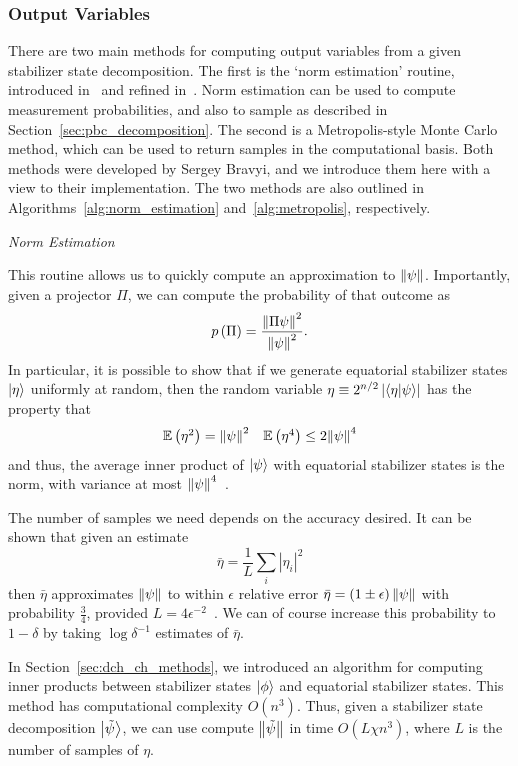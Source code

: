 \subsubsection*{Output Variables}
There are two main methods for computing output variables from a given stabilizer state decomposition. The first is the `norm estimation' routine, introduced in~\cite{Bravyi2016} and refined in~\cite{Bravyi2018}. Norm estimation can be used to compute measurement probabilities, and also to sample as described in Section~\ref{sec:pbc_decomposition}. The second is a Metropolis-style Monte Carlo method, which can be used to return samples in the computational basis. Both methods were developed by Sergey Bravyi, and we introduce them here with a view to their implementation. The two methods are also outlined in Algorithms~\ref{alg:norm_estimation} and~\ref{alg:metropolis}, respectively.\par
\large{\itshape{Norm Estimation}}\par
This routine allows us to quickly compute an approximation to $\norm{\psi}$. Importantly, given a projector $\Pi$, we can compute the probability of that outcome as
\begin{equation}
p\left(\Pi\right) = \frac{\norm{\Pi \psi}^{2}}{\norm{\psi}^{2}}.
\end{equation}
In particular, it is possible to show that if we generate equatorial stabilizer states $\ket{\eta}$ uniformly at random, then the random variable $\eta\equiv 2^{n/2}\left|\braket{\eta}{\psi}\right|$ has the property that
\[
\begin{array}{l r}
\mathbb{E}\left(\eta^{2}\right) = \norm{\psi}^{2} & \mathbb{E}\left(\eta^{4}\right) \leq 2\norm{\psi}^{4}
\end{array}
\]
and thus, the average inner product of $\ket{\psi}$ with equatorial stabilizer states is the norm, with variance at most $\norm{\psi}^{4}$~\cite{Bravyi2018}.\par
The number of samples we need depends on the accuracy desired. It can be shown that given an estimate 
\[\bar{\eta}=\frac{1}{L}\sum_{i}\left|\eta_{i}\right|^{2}\]
then $\bar{\eta}$ approximates $\norm{\psi}$ to within $\epsilon$ relative error $\bar{\eta}=\left(1\pm \epsilon\right)\norm{\psi}$ with probability $\frac{3}{4}$, provided $L=4\epsilon^{-2}$~\cite{Bravyi2018}. We can of course increase this probability to $1-\delta$ by taking $\log{\delta^{-1}}$ estimates of $\bar{\eta}$.\par
In Section~\ref{sec:dch_ch_methods}, we introduced an algorithm for computing inner products between stabilizer states $\ket{\phi}$ and equatorial stabilizer states. This method has computational complexity $O(n^{3})$. Thus, given a stabilizer state decomposition $\ket{\tilde{\psi}}$, we can use compute $\norm{\tilde{\psi}}$ in time $O(L\chi n^{3})$, where $L$ is the number of samples of $\eta$.\par
